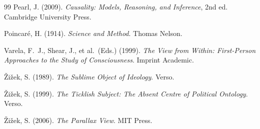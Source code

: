 \documentclass[10pt,a4paper]{article}
\begin{document}
\begin{thebibliography}{99}
Pearl, J. (2009).
\textit{Causality: Models, Reasoning, and Inference}, 2nd ed.
Cambridge University Press.

Poincar\'e, H. (1914).
\textit{Science and Method}.
Thomas Nelson.

Varela, F.~J., Shear, J., et al.\ (Eds.) (1999).
\textit{The View from Within: First-Person Approaches to the Study
of Consciousness}.
Imprint Academic.

Žižek, S. (1989).
\textit{The Sublime Object of Ideology}.
Verso.

Žižek, S. (1999).
\textit{The Ticklish Subject: The Absent Centre of Political Ontology}.
Verso.

Žižek, S. (2006).
\textit{The Parallax View}.
MIT Press.

\end{thebibliography}
\end{document}
